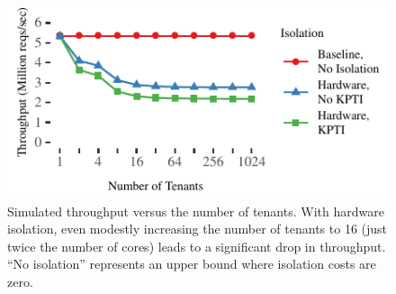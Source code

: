 \begin{figure}[t]
\centering
\includegraphics[width=1.0\columnwidth]{graphs/simulator.pdf}
\caption{Simulated throughput versus the number of tenants. With
	hardware isolation, even modestly increasing the number of
  tenants to 16 (just twice the number
	of cores) leads to a significant drop in throughput.
  ``No isolation'' represents an upper bound where isolation costs are zero.}
\label{fig:simulator}
\end{figure}
